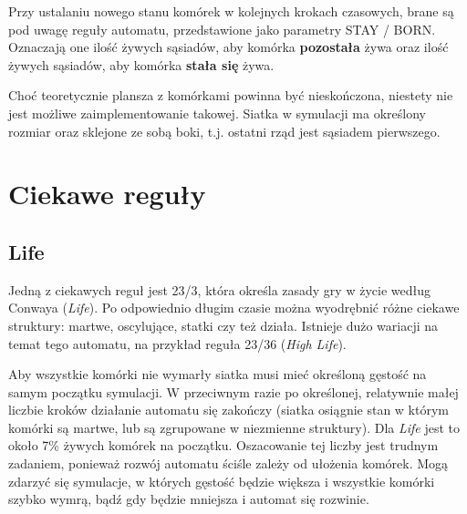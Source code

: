 \documentclass[12pt]{article}
\begin{document}
Przy ustalaniu nowego stanu komórek w kolejnych krokach czasowych, brane są pod uwagę reguły automatu, przedstawione jako parametry STAY / BORN. Oznaczają one ilość żywych sąsiadów, aby komórka \textbf{pozostała} żywa oraz ilość żywych sąsiadów, aby komórka \textbf{stała się} żywa.

Choć teoretycznie plansza z komórkami powinna być nieskończona, niestety nie jest możliwe zaimplementowanie takowej. Siatka w symulacji ma określony rozmiar oraz sklejone ze sobą boki, t.j. ostatni rząd jest sąsiadem pierwszego.

\section{Ciekawe reguły}
\subsection{Life}
Jedną z ciekawych reguł jest 23/3, która określa zasady gry w życie według Conwaya (\textit{Life}). Po odpowiednio długim czasie można wyodrębnić różne ciekawe struktury: martwe, oscylujące, statki czy też działa. Istnieje dużo wariacji na temat tego automatu, na przykład reguła 23/36 (\textit{High Life}).

Aby wszystkie komórki nie wymarły siatka musi mieć określoną gęstość na samym początku symulacji. W przeciwnym razie po określonej, relatywnie małej liczbie kroków działanie automatu się zakończy (siatka osiągnie stan w którym komórki są martwe, lub są zgrupowane w niezmienne struktury). Dla \textit{Life} jest to około 7\% żywych komórek na początku. Oszacowanie tej liczby jest trudnym zadaniem, ponieważ rozwój automatu ściśle zależy od ułożenia komórek. Mogą zdarzyć się symulacje, w których gęstość będzie większa i wszystkie komórki szybko wymrą, bądź gdy będzie mniejsza i automat się rozwinie.
\end{document}
